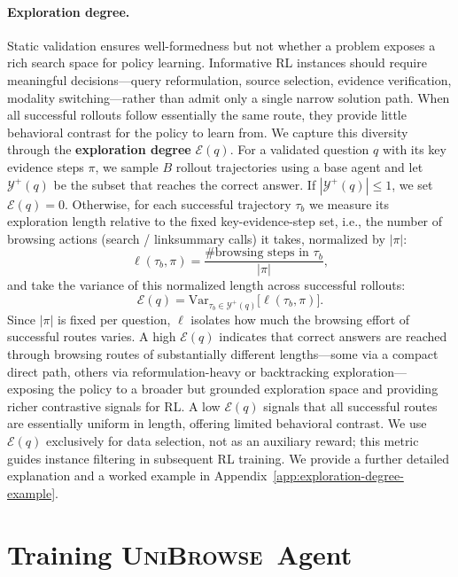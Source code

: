 \documentclass[11pt]{article}
\newcommand{\modelname}{\textsc{UniBrowse}}
\begin{document}
\paragraph{Exploration degree.}
Static validation ensures well-formedness but not whether a problem exposes a rich search space for policy learning.
Informative RL instances should require meaningful decisions---query reformulation, source selection, evidence verification, modality switching---rather than admit only a single narrow solution path.
When all successful rollouts follow essentially the same route, they provide little behavioral contrast for the policy to learn from.
We capture this diversity through the \textbf{exploration degree} $\mathcal{E}(q)$.
For a validated question $q$ with its key evidence steps $\pi$, we sample $B$ rollout trajectories using a base agent and let $\mathcal{Y}^{+}(q)$ be the subset that reaches the correct answer.
If $|\mathcal{Y}^{+}(q)| \le 1$, we set $\mathcal{E}(q)=0$.
Otherwise, for each successful trajectory $\tau_b$ we measure its exploration length relative to the fixed key-evidence-step set, i.e., the number of browsing actions (search / linksummary calls) it takes, normalized by $|\pi|$:
\begin{equation}
\ell(\tau_b, \pi) = \frac{\text{\# browsing steps in } \tau_b}{|\pi|},
\end{equation}
and take the variance of this normalized length across successful rollouts:
\begin{equation}
\mathcal{E}(q) = \mathrm{Var}_{\tau_b \in \mathcal{Y}^{+}(q)}\big[\ell(\tau_b, \pi)\big].
\end{equation}
Since $|\pi|$ is fixed per question, $\ell$ isolates how much the browsing effort of successful routes varies. A high $\mathcal{E}(q)$ indicates that correct answers are reached through browsing routes of substantially different lengths---some via a compact direct path, others via reformulation-heavy or backtracking exploration---exposing the policy to a broader but grounded exploration space and providing richer contrastive signals for RL.
A low $\mathcal{E}(q)$ signals that all successful routes are essentially uniform in length, offering limited behavioral contrast.
We use $\mathcal{E}(q)$ exclusively for data selection, not as an auxiliary reward; this metric guides instance filtering in subsequent RL training.
We provide a further detailed explanation and a worked example in Appendix~\ref{app:exploration-degree-example}.
\section{Training \modelname\ Agent}
\label{sec:training}
\end{document}
